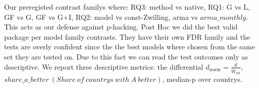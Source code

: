 Our preregisted contrast familys where: RQ3: method vs native, RQ1: G vs L, GF vs G, GF vs G+I, RQ2: model vs const-Zwilling, arma vs $arma\_monthly$. This acts as our defense against p-hacking. 
Post Hoc we did the best valid package per model family contrasts. They have their own FDR family and the tests are overly confident since the the best models where chosen from the same set they are tested on. Due to this fact we can read the test outcomes only as descriptive.
We report three descriptive metrics: the differential $d_{\text{norm}} = \frac{\bar{d}}{\bar{W}_{\text{ref}}}$, $share\_a\_better\ (Share\ of\ countrys\ with\ A\ better)$, median-p over countrys. 
%
%

